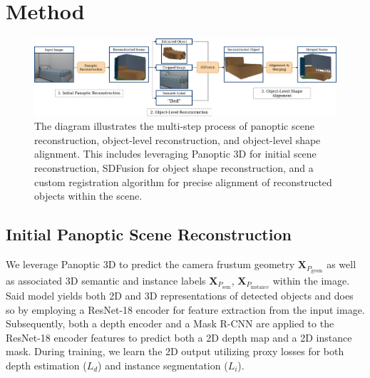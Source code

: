 \section{Method}
\label{sec:method}

\begin{figure}
  \centering
  \includegraphics[width=\linewidth]{figs/pipeline.png}
  \caption{The diagram illustrates the multi-step process of panoptic scene reconstruction, object-level reconstruction, and object-level shape alignment. This includes leveraging Panoptic 3D \citep{dahnert2021panoptic} for initial scene reconstruction, SDFusion \citep{cheng2023sdfusion}  for object shape reconstruction, and a custom registration algorithm for precise alignment of reconstructed objects within the scene.}
  \label{fig:pipeline}
\end{figure}

\subsection{Initial Panoptic Scene Reconstruction}

We leverage Panoptic 3D \citep{dahnert2021panoptic} to predict the camera frustum geometry $\mathbf{X}_{P_{\text{geom}}}$ as well as associated 3D
semantic and instance labels $\mathbf{X}_{P_{\text{sem}}}$, $\mathbf{X}_{P_{\text{instance}}}$  within the image. Said model yields both 2D and 3D representations of detected objects and
does so by employing a ResNet-18 \citep{he2016deep} encoder for feature extraction from the input image. Subsequently,
both a depth encoder and a Mask R-CNN \citep{he2017mask} are applied to the ResNet-18 encoder features to predict both a 2D depth map
and a 2D instance mask.
During training, we learn the 2D output utilizing proxy losses for both depth estimation ($L_d$) and instance segmentation ($L_i$).


